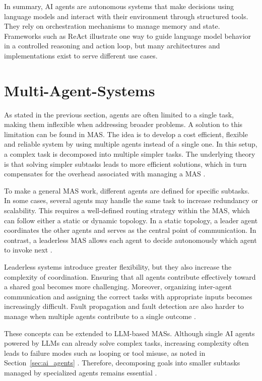\documentclass[a4paper,oneside,bibliography=totoc]{scrbook}
\begin{document}
In summary, \ac{AI} agents are autonomous systems that make decisions using language models and interact with their environment through structured tools. They rely on orchestration mechanisms to manage memory and state. Frameworks such as ReAct illustrate one way to guide language model behavior in a controlled reasoning and action loop, but many architectures and implementations exist to serve different use cases.

\section{Multi-Agent-Systems}
\label{sec:multi_agent_systems}

As stated in the previous section, agents are often limited to a single task, making them inflexible when addressing broader problems. A solution to this limitation can be found in \ac{MAS}. The idea is to develop a cost efficient, flexible and reliable system by using multiple agents instead of a single one. In this setup, a complex task is decomposed into multiple simpler tasks. The underlying theory is that solving simpler subtasks leads to more efficient solutions, which in turn compensates for the overhead associated with managing a \ac{MAS} \cite{Dorri2018}.

To make a general \ac{MAS} work, different agents are defined for specific subtasks. In some cases, several agents may handle the same task to increase redundancy or scalability. This requires a well-defined routing strategy within the \ac{MAS}, which can follow either a static or dynamic topology. In a static topology, a leader agent coordinates the other agents and serves as the central point of communication. In contrast, a leaderless \ac{MAS} allows each agent to decide autonomously which agent to invoke next \cite{Dorri2018}.

Leaderless systems introduce greater flexibility, but they also increase the complexity of coordination. Ensuring that all agents contribute effectively toward a shared goal becomes more challenging. Moreover, organizing inter-agent communication and assigning the correct tasks with appropriate inputs becomes increasingly difficult. Fault propagation and fault detection are also harder to manage when multiple agents contribute to a single outcome \cite{Dorri2018}.

These concepts can be extended to \ac{LLM}-based \acp{MAS}. Although single \ac{AI} agents powered by \acp{LLM} can already solve complex tasks, increasing complexity often leads to failure modes such as looping or tool misuse, as noted in Section~\ref{sec:ai_agents} \cite{OpenAI2025}. Therefore, decomposing goals into smaller subtasks managed by specialized agents remains essential \cite{Sapkota2025}.
\end{document}
